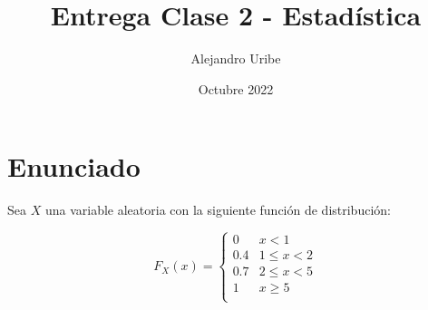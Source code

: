 \documentclass[a4paper,spanish]{article}
\title{Entrega Clase 2 - Estadística}
\author{Alejandro Uribe}
\date{Octubre 2022}
\begin{document}
\maketitle
\section*{Enunciado}

Sea $X$ una variable aleatoria con la siguiente función de distribución:

\[
    F_X(x) =
    \begin{cases}
        0   & \text{$x<1$}          \\
        0.4 & \text{$1 \leq x < 2$} \\
        0.7 & \text{$2 \leq x < 5$} \\
        1   & \text{$x \geq 5$}     \\
    \end{cases}
\]
\end{document}
